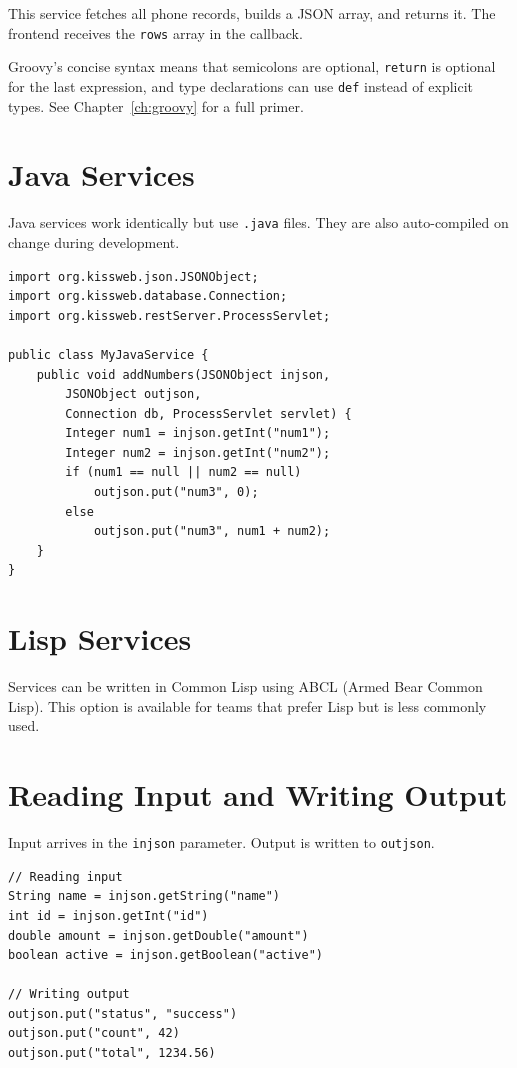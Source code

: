 \noindent
This service fetches all phone records, builds a JSON array, and returns it.  The frontend receives the \texttt{rows} array in the callback.

\begin{notebox}
Groovy's concise syntax means that semicolons are optional, \texttt{return} is optional for the last expression, and type declarations can use \texttt{def} instead of explicit types.  See Chapter~\ref{ch:groovy} for a full primer.
\end{notebox}

\section{Java Services}
\label{sec:svc-java}

Java services work identically but use \texttt{.java} files.  They are also auto-compiled on change during development.

\begin{lstlisting}[style=java]
import org.kissweb.json.JSONObject;
import org.kissweb.database.Connection;
import org.kissweb.restServer.ProcessServlet;

public class MyJavaService {
    public void addNumbers(JSONObject injson,
        JSONObject outjson,
        Connection db, ProcessServlet servlet) {
        Integer num1 = injson.getInt("num1");
        Integer num2 = injson.getInt("num2");
        if (num1 == null || num2 == null)
            outjson.put("num3", 0);
        else
            outjson.put("num3", num1 + num2);
    }
}
\end{lstlisting}

\section{Lisp Services}
\label{sec:svc-lisp}

Services can be written in Common Lisp using ABCL (Armed Bear Common Lisp).  This option is available for teams that prefer Lisp but is less commonly used.

\section{Reading Input and Writing Output}
\label{sec:svc-io}

Input arrives in the \texttt{injson} parameter.  Output is written to \texttt{outjson}.

\begin{lstlisting}[style=groovy]
// Reading input
String name = injson.getString("name")
int id = injson.getInt("id")
double amount = injson.getDouble("amount")
boolean active = injson.getBoolean("active")

// Writing output
outjson.put("status", "success")
outjson.put("count", 42)
outjson.put("total", 1234.56)
\end{lstlisting}


